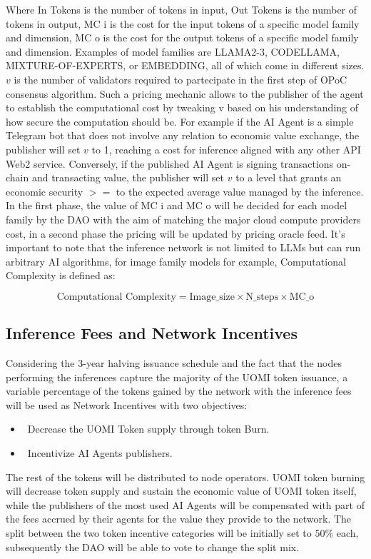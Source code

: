 \documentclass{article}
\begin{document}
Where In Tokens is the number of tokens in input, Out Tokens is the number of tokens in output, MC i is the cost for the input tokens of a specific model family and dimension, MC o is the cost for the output tokens of a specific model family and dimension.  Examples of model families are LLAMA2-3, CODELLAMA,  MIXTURE-OF-EXPERTS, or EMBEDDING, all of which come in different sizes.  \(v\) is the number of validators required to partecipate in the first step of OPoC consensus algorithm. Such a pricing mechanic allows to the publisher of the agent to establish the computational cost by tweaking v based on his understanding of how secure the computation should be. For example if the AI Agent is a simple Telegram bot that does not involve any relation to economic value exchange, the publisher will set \(v\) to 1, reaching a cost for inference aligned with any other API Web2 service. Conversely, if the published AI Agent is signing transactions on-chain and transacting value, the publisher will set \(v\) to a level that grants an economic security \(>=\) to the expected average value managed by the inference. 
In the first phase, the value of MC i and MC o will be decided for each model family by the DAO with the aim of matching the major cloud compute providers cost, in a second phase the pricing will be updated by pricing oracle feed. It's important to note that the inference network is not limited to LLMs but can run arbitrary AI algorithms, for image family models for example, Computational Complexity is defined as: 

\[\text{Computational Complexity} = \text{Image\_size} \times \text{N\_steps} \times \text{MC\_o} \]

\subsection{Inference Fees and Network Incentives}

Considering the 3-year halving issuance schedule and the fact that the nodes performing the inferences capture the majority of the UOMI token issuance, a variable percentage of the tokens gained by the network with the inference fees will be used as Network Incentives with two objectives: 
\begin{itemize}
\item \ Decrease the UOMI Token supply through token Burn.
\item \ Incentivize AI Agents publishers.
\end{itemize}

The rest of the tokens will be distributed to node operators. UOMI token burning will decrease token supply and sustain the economic value of UOMI token itself, while the publishers of the most used AI Agents will be compensated with part of the fees accrued by their agents for the value they provide to the network. The split between the two token incentive categories will be initially set to \( 50\%\) each, subsequently the DAO will be able to vote to change the split mix.
\end{document}
